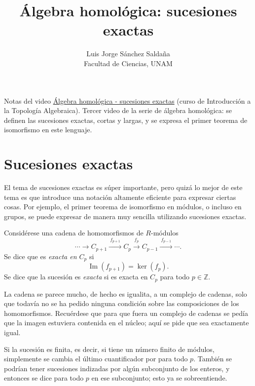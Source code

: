 \documentclass[11pt]{article}
\title{Álgebra homológica: sucesiones exactas}
\author{Luis Jorge Sánchez Saldaña\\[2pt]\small Facultad de Ciencias, UNAM}
\date{}
\begin{document}
\maketitle

\noindent\small Notas del video
\href{https://www.youtube.com/watch?v=l_DwGxGVD1o}{\guillemotleft{}Álgebra homológica - sucesiones exactas\guillemotright{}}
(curso de Introducción a la Topología Algebraica). Tercer video de la serie de álgebra homológica: se definen las sucesiones exactas, cortas y largas, y se expresa el primer teorema de isomorfismo en este lenguaje.
\normalsize

\section*{Sucesiones exactas}

El tema de sucesiones exactas es súper importante, pero quizá lo mejor de este tema es que introduce una notación altamente eficiente para expresar ciertas cosas. Por ejemplo, el primer teorema de isomorfismo en módulos, o incluso en grupos, se puede expresar de manera muy sencilla utilizando sucesiones exactas.

\begin{defn}\label{def:exacta}
Considérese una cadena de homomorfismos de $R$-módulos
\[
  \cdots\longrightarrow C_{p+1}\xrightarrow{\ f_{p+1}\ }C_p\xrightarrow{\ f_p\ }C_{p-1}\xrightarrow{\ f_{p-1}\ }\cdots.
\]
Se dice que es \emph{exacta en $C_p$} si
\[
  \operatorname{Im}(f_{p+1})=\ker(f_p).
\]
Se dice que la sucesión es \emph{exacta} si es exacta en $C_p$ para todo $p\in\mathbb Z$.
\end{defn}

La cadena se parece mucho, de hecho es igualita, a un complejo de cadenas, solo que todavía no se ha pedido ninguna condición sobre las composiciones de los homomorfismos. Recuérdese que para que fuera un complejo de cadenas se pedía que la imagen estuviera contenida en el núcleo; aquí se pide que sea exactamente igual.

Si la sucesión es finita, es decir, si tiene un número finito de módulos, simplemente se cambia el último cuantificador por \guillemotleft{}para todo $p$\guillemotright{}. También se podrían tener sucesiones indizadas por algún subconjunto de los enteros, y entonces se dice \guillemotleft{}para todo $p$\guillemotright{} en ese subconjunto; esto ya se sobreentiende.
\end{document}
